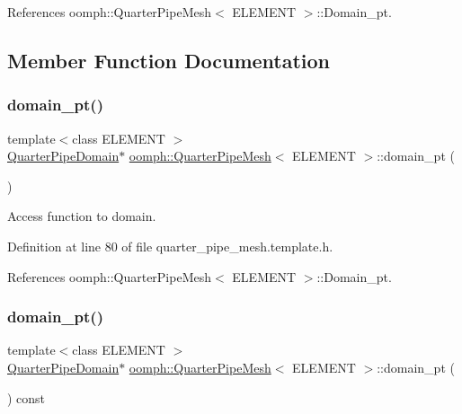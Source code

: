 References oomph\+::\+Quarter\+Pipe\+Mesh$<$ E\+L\+E\+M\+E\+N\+T $>$\+::\+Domain\+\_\+pt.



\subsection{Member Function Documentation}
\mbox{\label{classoomph_1_1QuarterPipeMesh_a9a1bce41d07ab1bdb8f83e77f59c4a1b}} 
\subsubsection{\texorpdfstring{domain\+\_\+pt()}{domain\_pt()}\hspace{0.1cm}{\footnotesize\ttfamily [1/2]}}
{\footnotesize\ttfamily template$<$class E\+L\+E\+M\+E\+NT $>$ \\
\hyperlink{classoomph_1_1QuarterPipeDomain}{Quarter\+Pipe\+Domain}$\ast$ \hyperlink{classoomph_1_1QuarterPipeMesh}{oomph\+::\+Quarter\+Pipe\+Mesh}$<$ E\+L\+E\+M\+E\+NT $>$\+::domain\+\_\+pt (\begin{DoxyParamCaption}{ }\end{DoxyParamCaption})\hspace{0.3cm}{\ttfamily [inline]}}



Access function to domain. 



Definition at line 80 of file quarter\+\_\+pipe\+\_\+mesh.\+template.\+h.



References oomph\+::\+Quarter\+Pipe\+Mesh$<$ E\+L\+E\+M\+E\+N\+T $>$\+::\+Domain\+\_\+pt.

\mbox{\label{classoomph_1_1QuarterPipeMesh_ade9c9f2cbf3c9e722a480e7a056d4c63}} 
\subsubsection{\texorpdfstring{domain\+\_\+pt()}{domain\_pt()}\hspace{0.1cm}{\footnotesize\ttfamily [2/2]}}
{\footnotesize\ttfamily template$<$class E\+L\+E\+M\+E\+NT $>$ \\
\hyperlink{classoomph_1_1QuarterPipeDomain}{Quarter\+Pipe\+Domain}$\ast$ \hyperlink{classoomph_1_1QuarterPipeMesh}{oomph\+::\+Quarter\+Pipe\+Mesh}$<$ E\+L\+E\+M\+E\+NT $>$\+::domain\+\_\+pt (\begin{DoxyParamCaption}{ }\end{DoxyParamCaption}) const\hspace{0.3cm}{\ttfamily [inline]}}



